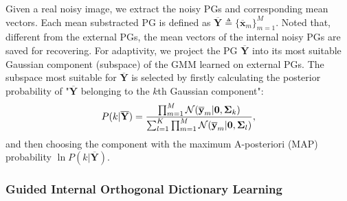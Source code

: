 \documentclass[10pt,twocolumn,letterpaper]{article}
\begin{document}
Given a real noisy image, we extract the noisy PGs and corresponding mean vectors. Each mean substracted PG is defined as $\mathbf{\overline{Y}}\triangleq \{\mathbf{\overline{x}}_{m}\}_{m=1}^{M}$. Noted that, different from the external PGs, the mean vectors of the internal noisy PGs are saved for recovering. For adaptivity, we project the PG $\mathbf{\overline{Y}}$ into its most suitable Gaussian component (subspace) of the GMM learned on external PGs. The subspace most suitable for $\mathbf{\overline{Y}}$ is selected by firstly calculating the posterior probability of "$\mathbf{\overline{Y}}$ belonging to the $k$th Gaussian component":
\vspace{-2mm}
\begin{equation}\label{equ5}\vspace{-1mm}
P(k|\mathbf{\overline{Y}})=\frac{\prod_{m=1}^{M}\mathcal{N}(\mathbf{\overline{y}}_{m}|\mathbf{0},\mathbf{\Sigma}_{k})}{\sum_{l=1}^{K}\prod_{m=1}^{M}\mathcal{N}(\mathbf{\overline{y}}_{m}|\mathbf{0},\mathbf{\Sigma}_{l})},
\end{equation}
and then choosing the component with the maximum A-posteriori (MAP) probability $\ln P(k|\mathbf{\overline{Y}})$.

\vspace{-2mm}
\subsubsection{Guided Internal Orthogonal Dictionary Learning}
\vspace{-2mm}
\end{document}
